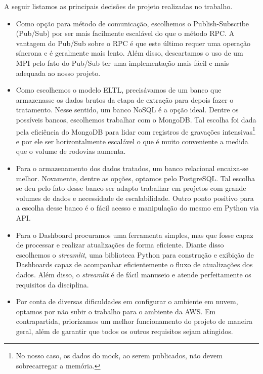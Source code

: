 \documentclass{article}
\begin{document}
A seguir listamos as principais decisões de projeto realizadas no trabalho.
\begin{itemize}
    \item Como opção para método de comunicação, escolhemos o Publish-Subscribe (Pub/Sub) por ser mais facilmente escalável do que o método RPC. A vantagem do Pub/Sub sobre o RPC é que este último requer uma operação síncrona e é geralmente mais lento. Além disso, descartamos o uso de um MPI pelo fato do Pub/Sub ter uma implementação mais fácil e mais adequada ao nosso projeto.

    \item Como escolhemos o modelo ELTL, precisávamos de um banco que armazenasse os dados brutos da etapa de extração para depois fazer o tratamento. Nesse sentido, um banco NoSQL é a opção ideal. Dentre os possíveis bancos, escolhemos trabalhar com o MongoDB. Tal escolha foi dada pela eficiência do MongoDB para lidar com registros de gravações intensivas\footnote{No nosso caso, os dados do mock, ao serem publicados, não devem sobrecarregar a memória.} e por ele ser horizontalmente escalável o que é muito conveniente a medida que o volume de rodovias aumenta.

    \item Para o armazenamento dos dados tratados, um banco relacional encaixa-se melhor. Novamente, dentre as opções, optamos pelo PostgreSQL. Tal escolha se deu pelo fato desse banco ser adapto trabalhar em projetos com grande volumes de dados e necessidade de escalabilidade. Outro ponto positivo para a escolha desse banco é o fácil acesso e manipulação do mesmo em Python via API.
    
    \item Para o Dashboard procuramos uma ferramenta simples, mas que fosse capaz de processar e realizar atualizações de forma eficiente. Diante disso escolhemos o \textit{streamlit}, uma biblioteca Python para construção e exibição de Dashboards capaz de acompanhar eficientemente o fluxo de atualizações dos dados. Além disso, o \textit{streamlit} é de fácil manuseio e atende perfeitamente os requisitos da disciplina.

    \item Por conta de diversas dificuldades em configurar o ambiente em nuvem, optamos por não subir o trabalho para o ambiente da AWS. Em contrapartida, priorizamos um melhor funcionamento do projeto de maneira geral, além de garantir que todos os outros requisitos sejam atingidos.
\end{itemize}
\end{document}
